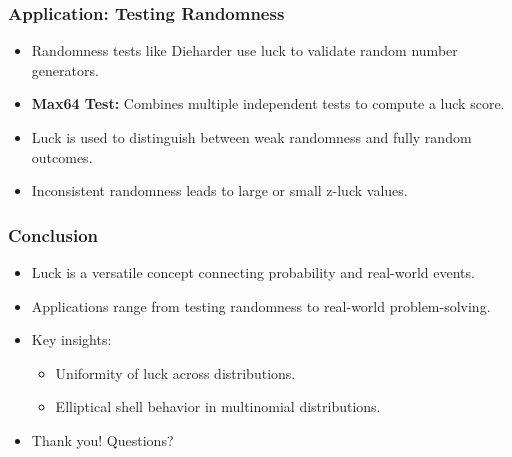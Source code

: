 \documentclass{beamer}
\begin{document}
\begin{frame}
\frametitle{Application: Testing Randomness}
\begin{itemize}
    \item Randomness tests like Dieharder use luck to validate random number generators.
    \item \textbf{Max64 Test:} Combines multiple independent tests to compute a luck score.
    \item Luck is used to distinguish between weak randomness and fully random outcomes.
    \item Inconsistent randomness leads to large or small z-luck values.
\end{itemize}
\end{frame}

\begin{frame}
\frametitle{Conclusion}
\begin{itemize}
    \item Luck is a versatile concept connecting probability and real-world events.
    \item Applications range from testing randomness to real-world problem-solving.
    \item Key insights:
        \begin{itemize}
            \item Uniformity of luck across distributions.
            \item Elliptical shell behavior in multinomial distributions.
        \end{itemize}
    \item Thank you! Questions?
\end{itemize}
\end{frame}
\end{document}
